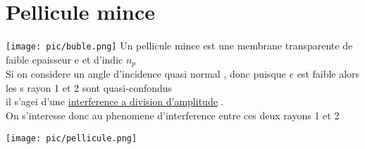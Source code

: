 \documentclass[12pt]{book}
\begin{document}
        \section{Pellicule mince}
            
            \begin{center}
                \begin{minipage}{0.59\linewidth}
                    \texttt{[image: pic/buble.png]}
                    Un pellicule mince est une membrane transparente de faible epaisseur e et d'indic $n_p$ \\
                    Si on considere un angle d'incidence quasi normal , donc puisque $e$ est faible alors les s rayon 1 et 2 sont quasi-confondus\\
                    il s'agei d'une \underline{interference a division d'amplitude} . \\
                    On s'interesse donc au phenomene d'interference entre ces deux rayons 1 et 2 \vspace*{15px}
                \end{minipage}
                \begin{minipage}{0.38\linewidth}
                    \texttt{[image: pic/pellicule.png]}
                    
                \end{minipage}
            \end{center}
\end{document}

